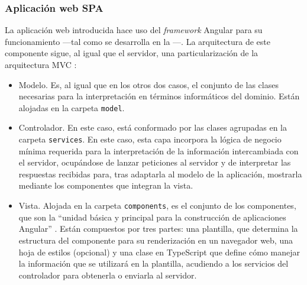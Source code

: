 \subsubsection{Aplicación web SPA}
\label{subsec:arqAppWeb}
La aplicación web introducida hace uso del \textit{framework} Angular para su funcionamiento ---tal como se desarrolla en la ---. La arquitectura de este componente sigue, al igual que el servidor, una particularización de la arquitectura MVC \cite{Arq_MVCFowler}:
\begin{itemize}
    \item Modelo. Es, al igual que en los otros dos casos, el conjunto de las clases necesarias para la interpretación en términos informáticos del dominio. Están alojadas en la carpeta \texttt{model}.
    \item Controlador. En este caso, está conformado por las clases agrupadas en la carpeta \texttt{services}. En este caso, esta capa incorpora la lógica de negocio mínima requerida para la interpretación de la información intercambiada con el servidor, ocupándose de lanzar peticiones al servidor y de interpretar las respuestas recibidas para, tras adaptarla al modelo de la aplicación, mostrarla mediante los componentes que integran la vista.
    \item Vista. Alojada en la carpeta \texttt{components}, es el conjunto de los componentes, que son la ``unidad básica y principal para la construcción de aplicaciones Angular'' \cite{Arq_AngularComponents}. Están compuestos por tres partes: una plantilla, que determina la estructura del componente para su renderización en un navegador web, una hoja de estilos (opcional) y una clase en TypeScript que define cómo manejar la información que se utilizará en la plantilla, acudiendo a los servicios del controlador para obtenerla o enviarla al servidor.
\end{itemize}

